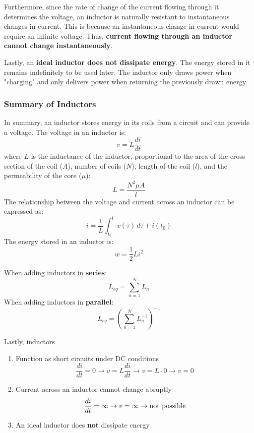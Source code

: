 \documentclass[12pt]{article}
\begin{document}
Furthermore, since the rate of change of the current flowing through it determines the voltage, an inductor is naturally resistant to instantaneous changes in current. This is because an instantaneous change in current would require an infinite voltage. Thus, \textbf{current flowing through an inductor cannot change instantaneously}.

Lastly, an \textbf{ideal inductor does not dissipate energy}. The energy stored in it remains indefinitely to be used later. The inductor only draws power when "charging" and only delivers power when returning the previously drawn energy.

\subsubsection{Summary of Inductors}
\label{sssec:summaryOfInductors}

In summary, an inductor stores energy in its coils from a circuit and can provide a voltage. The voltage in an inductor is:
\begin{equation*}
  v = L \frac{di}{dt}
\end{equation*}
where $L$ is the inductance of the inductor, proportional to the area of the cross-section of the coil ($A$), number of coils ($N$), length of the coil ($l$), and the permeability of the core ($\mu$):
\begin{equation*}
  L = \frac{N^2 \mu A}{l}
\end{equation*}
The relationship between the voltage and current across an inductor can be expressed as:
\begin{equation*}
  i = \frac{1}{L} \int_{t_0}^{t} v(\tau) \,d \tau + i(t_0)
\end{equation*}
The energy stored in an inductor is:
\begin{equation*}
  w = \frac{1}{2}Li^2
\end{equation*}

When adding inductors in \textbf{series}:
\begin{equation*}
  L_{eq} = \sum_{n=1}^{N} L_n
\end{equation*}
When adding inductors in \textbf{parallel}:
\begin{equation*}
  L_{eq} = \left(\sum_{n=1}^{N} L_{n}^{-1}\right)^{-1}
\end{equation*}

Lastly, inductors
\begin{enumerate}
  \itemsep0em
  \item Function as short circuits under DC conditions
    \begin{equation*}
      \frac{di}{dt}=0 \rightarrow v = L \frac{di}{dt} \rightarrow v = L \cdot 0 \rightarrow v = 0
    \end{equation*}
  \item Current across an inductor cannot change abruptly
    \begin{equation*}
      \frac{di}{dt}=\infty \rightarrow v = \infty \rightarrow \textup{not possible}
    \end{equation*}
  \item An ideal inductor does \textbf{not} dissipate energy
\end{enumerate}
\end{document}
